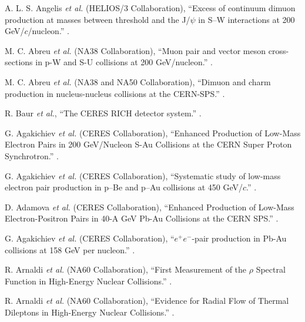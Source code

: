 \begin{thebibliography}{10}
A. L. S. Angelis {\it et al.} (HELIOS/3 Collaboration),
\newblock ``Excess of continuum dimuon production at masses between threshold and the J/$\psi$ in S–W interactions at 200 GeV/$c$/nucleon.''
.

M. C.  Abreu {\it et al.} (NA38 Collaboration),
\newblock ``Muon pair and vector meson cross-sections in p-W and S-U collisions at 200 GeV/nucleon.''
.

M. C.  Abreu {\it et al.} (NA38 and NA50 Collaboration),
\newblock ``Dimuon and charm production in nucleus-nucleus collisions at the CERN-SPS.''
.

R. Baur {\it et al.},
\newblock ``The CERES RICH detector system.''
.

G. Agakichiev {\it et al.} (CERES Collaboration),
\newblock ``Enhanced Production of Low-Mass Electron Pairs in 200 GeV/Nucleon S-Au Collisions at the CERN Super Proton Synchrotron.''
.

G. Agakichiev {\it et al.} (CERES Collaboration),
\newblock ``Systematic study of low-mass electron pair production in p–Be and p–Au collisions at 450 GeV/$c$.''
.

D. Adamova {\it et al.} (CERES Collaboration),
\newblock ``Enhanced Production of Low-Mass Electron-Positron Pairs in 40-A GeV Pb-Au Collisions at the CERN SPS.''
.

G. Agakichiev {\it et al.} (CERES Collaboration),
\newblock ``$e^{+}e^{-}$-pair production in Pb-Au collisions at 158 GeV per nucleon.''
.

R. Arnaldi {\it et al.} (NA60 Collaboration),
\newblock ``First Measurement of the $\rho$ Spectral Function in High-Energy Nuclear Collisions.''
.

R. Arnaldi {\it et al.} (NA60 Collaboration),
\newblock ``Evidence for Radial Flow of Thermal Dileptons in High-Energy Nuclear Collisions.''
.


\end{thebibliography}
